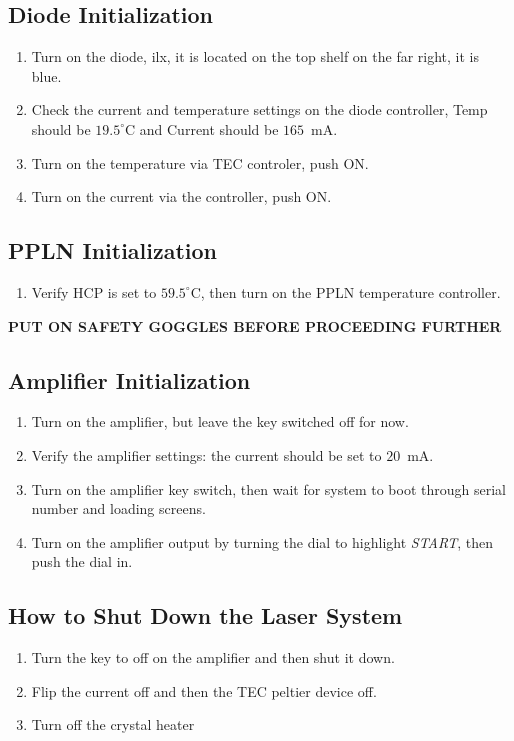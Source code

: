 \documentclass[11pt, letterpaper]{article}
\begin{document}
\subsection{Diode Initialization}
\begin{enumerate}
    \item Turn on the diode, ilx, it is located on the top shelf on the far right, it is blue.
    \item Check the current and temperature settings on the diode controller, Temp should be $19.5^{\circ}$C and Current should be $165$~mA.
    \item Turn on the temperature via TEC controler, push ON.
    \item Turn on the current via the controller, push ON.
\end{enumerate}
\subsection{PPLN Initialization}
\begin{enumerate}
    \item Verify HCP is set to $59.5^{\circ}$C, then turn on the PPLN temperature controller.
\end{enumerate}
\begin{center}
    \textbf{PUT ON SAFETY GOGGLES BEFORE PROCEEDING FURTHER}
\end{center}
\subsection{Amplifier Initialization}
\begin{enumerate}
    \item Turn on the amplifier, but leave the key switched off for now.
    \item Verify the amplifier settings: the current should be set to $20$~mA.
    \item Turn on the amplifier key switch, then wait for system to boot through serial number and loading screens.
    \item Turn on the amplifier output by turning the dial to highlight \textit{START}, then push the dial in.
\end{enumerate}

\subsection{How to Shut Down the Laser System}
\begin{enumerate}
    \item Turn the key to off on the amplifier and then shut it down.
    \item Flip the current off and then the TEC peltier device off.
    \item Turn off the crystal heater
\end{enumerate}
\end{document}

